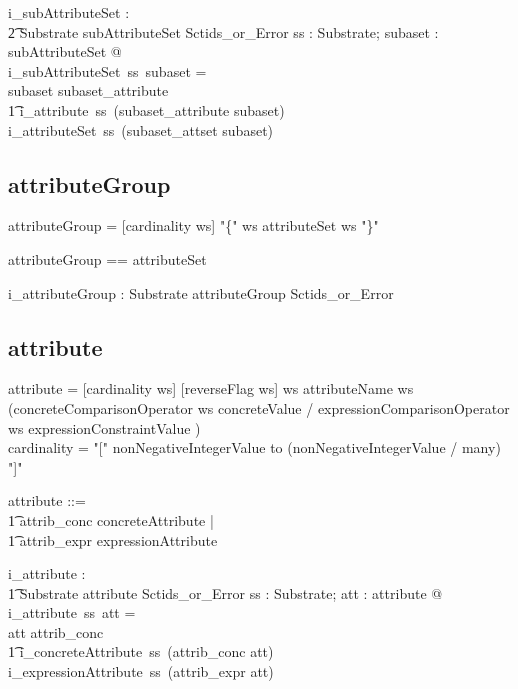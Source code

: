 \documentclass{article}
\def\bnf#1{{\scriptsize {{#1}} }}
\begin{document}
\begin{gendef}
   i\_subAttributeSet : \\
\t2 Substrate \fun subAttributeSet \fun Sctids\_or\_Error
\where
   \forall ss : Substrate; subaset : subAttributeSet @ \\
   i\_subAttributeSet~ss~subaset = \\
   \IF subaset \in \ran subaset\_attribute \\
\t1 \THEN i\_attribute~ss~(subaset\_attribute \inv subaset) \\
  \ELSE i\_attributeSet~ss~(subaset\_attset \inv subaset)
\end{gendef}

\subsection{attributeGroup}
\begin{framed}
\noindent
\bnf{attributeGroup = [cardinality ws] "\{" ws attributeSet ws "\}"}
\end{framed}

\begin{zed}
attributeGroup == \optional[cardinality] \cross attributeSet
\end{zed}

\begin{gendef}
   i\_attributeGroup : Substrate \fun attributeGroup \fun Sctids\_or\_Error
\end{gendef}



\subsection{attribute}
\begin{framed}
\noindent
\bnf{attribute = [cardinality ws] [reverseFlag ws] ws attributeName ws 
	(concreteComparisonOperator ws concreteValue / 
	expressionComparisonOperator ws expressionConstraintValue )} \\
\bnf{cardinality = "[" nonNegativeIntegerValue to (nonNegativeIntegerValue / many) "]" }
\end{framed}


\begin{zed}
   attribute ::= \\
\t1 attrib\_conc \ldata concreteAttribute \rdata | \\
\t1 attrib\_expr \ldata expressionAttribute \rdata
\end{zed}

\begin{gendef}
   i\_attribute : \\
\t1 Substrate \fun attribute \fun Sctids\_or\_Error
\where
   \forall ss : Substrate; att : attribute @ \\
   i\_attribute~ss~att = \\
   \IF att \in \ran attrib\_conc \\
\t1 \THEN i\_concreteAttribute~ss~(attrib\_conc \inv att) \\
   \ELSE i\_expressionAttribute~ss~(attrib\_expr \inv att)
\end{gendef}
\end{document}
